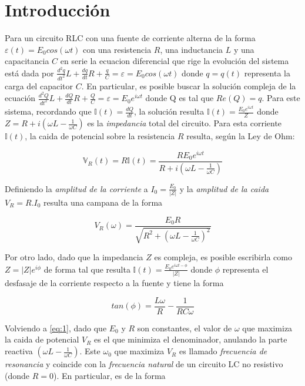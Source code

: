 \documentclass[11pt,a4paper]{article}
\begin{document}
\section{Introducción}\label{sec:intro}

Para un circuito RLC con una fuente de corriente alterna de la forma $\varepsilon(t) = E_{0}cos(\omega t)$ con una resistencia $R$, una inductancia $L$ y una capacitancia $C$ en serie la ecuacion diferencial que rige la evolución del sistema está dada por $\frac{d^2q}{dt^2}L+\frac{dq}{dt}R+\frac{q}{C} = \varepsilon = E_{0}cos(\omega t)$\cite{Trelles} donde $q = q(t)$ representa la carga del capacitor $C$. En particular, es posible buscar la solución compleja de la ecuación $\frac{d^2Q}{dt^2}L+\frac{dQ}{dt}R+\frac{Q}{C} = \varepsilon = E_{0}e^{i\omega t}$ donde Q es tal que $Re(Q) = q$. Para este sistema, recordando que $\mathbb{I}(t) = \frac{dQ}{dt}$, la solución resulta $\mathbb{I}(t) = \frac{E_0e^{i\omega t}}{Z}$ donde $Z = R +i(\omega L-\frac{1}{\omega C})$ es la \textit{impedancia} total del circuito. Para esta corriente $\mathbb{I}(t)$, la caida de potencial sobre la resistencia $R$ resulta, según la Ley de Ohm\cite{Trelles}: 

\begin{equation}
\mathbb{V}_R(t) = R\mathbb{I}(t) = \frac{RE_0e^{i\omega t}}{R +i(\omega L-\frac{1}{\omega C})}
\label{eq:ohm}
\end{equation}

Definiendo la \textit{amplitud de la corriente} a $I_0 = \frac{E_0}{|Z|}$ y la \textit{amplitud de la caida} $V_R = R.I_0$ resulta una campana de la forma

\begin{equation}
V_R(\omega) = \frac{E_{0}R}{\sqrt{R^2 + (\omega L - \frac{1}{\omega C})^2}}
\label{eq:1}
\end{equation}

Por otro lado, dado que la impedancia $Z$ es compleja, es posible escribirla como $Z = |Z|e^{i\phi}$ de forma tal que resulta $\mathbb{I}(t) = \frac{E_0e^{i\omega t-\phi}}{|Z|}$ donde $\phi$ representa el desfasaje de la corriente respecto a la fuente y tiene la forma

\begin{equation}
tan(\phi) = \frac{L\omega}{R} - \frac{1}{RC\omega} 
\label{eq:2}
\end{equation}

Volviendo a \eqref{eq:1}, dado que $E_0$ y $R$ son constantes, el valor de $\omega$ que maximiza la caida de potencial $V_R$ es el que minimiza el denominador, anulando la parte reactiva $(\omega L - \frac{1}{\omega C})$. Este $\omega_0$ que maximiza $V_R$ es llamado \textit{frecuencia de resonancia} y coincide con la \textit{frecuencia natural} de un circuito LC no resistivo\cite{Trelles} (donde $R=0$). En particular, es de la forma 
\end{document}
